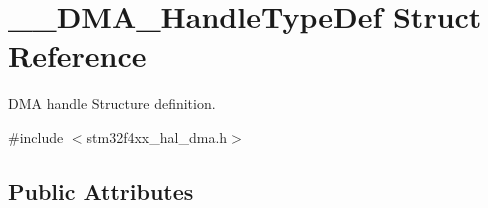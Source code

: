 \hypertarget{struct_____d_m_a___handle_type_def}{}\section{\+\_\+\+\_\+\+D\+M\+A\+\_\+\+Handle\+Type\+Def Struct Reference}
\label{struct_____d_m_a___handle_type_def}


D\+MA handle Structure definition.  




{\ttfamily \#include $<$stm32f4xx\+\_\+hal\+\_\+dma.\+h$>$}

\subsection*{Public Attributes}
